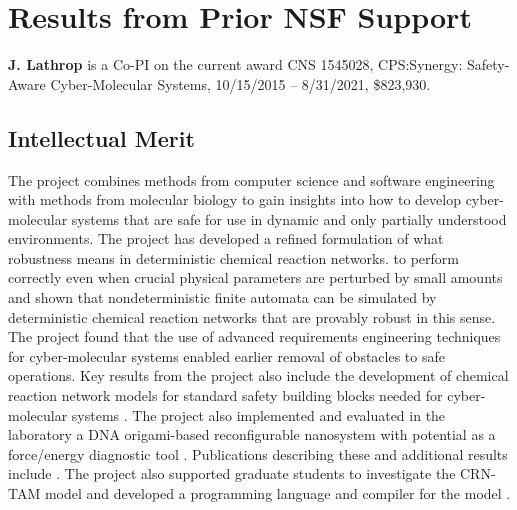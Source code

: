 
\section{Results from Prior NSF Support}
\label{sec:prior_nsf_support}

{\bf J. Lathrop} is a Co-PI on the current award CNS 1545028, CPS:Synergy: Safety-Aware Cyber-Molecular Systems, 10/15/2015 -- 8/31/2021, \$823,930.

\subsection*{Intellectual Merit}
The project combines methods from computer science and software engineering with methods from molecular biology to gain insights into how to develop cyber-molecular systems that are safe for use in dynamic and only partially understood environments.
The project has developed a refined formulation of what robustness means in deterministic chemical reaction networks. to  perform correctly even when crucial physical parameters are perturbed by small amounts and shown that nondeterministic finite automata can be simulated by deterministic chemical reaction networks that are provably robust in this sense.  
The project found that the use of advanced requirements engineering techniques for cyber-molecular systems enabled earlier removal of obstacles to safe operations.  Key results from the project also include the development of chemical reaction network models for standard safety building blocks needed for cyber-molecular systems \cite{jKlLaLu20,  cElLaLu17, cElKlLa17, jEKLLLM17}.
The project also implemented and evaluated in the laboratory a DNA origami-based reconfigurable nanosystem with potential as a force/energy diagnostic tool \cite{jMatHen16, oMath16}.    Publications describing these and additional results include \cite{cKlin16,  cHuaStu16, jCaLuSt18, cElKlLa17,  jHKLLL18}.
The project also supported graduate students to investigate the CRN-TAM model and developed a programming language and compiler for the model \cite{ALCH}.

